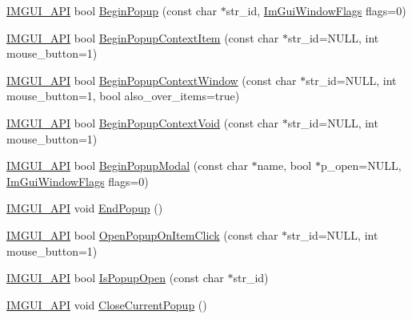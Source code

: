 \begin{DoxyCompactItemize}
\mbox{\hyperlink{imgui_8h_a43829975e84e45d1149597467a14bbf5}{I\+M\+G\+U\+I\+\_\+\+A\+PI}} bool \mbox{\hyperlink{namespace_im_gui_a10e213926d8ca212266bc5fbded1e026}{Begin\+Popup}} (const char $\ast$str\+\_\+id, \mbox{\hyperlink{imgui_8h_a0b8e067ab4f7a818828c8d89e531addc}{Im\+Gui\+Window\+Flags}} flags=0)
\item 
\mbox{\hyperlink{imgui_8h_a43829975e84e45d1149597467a14bbf5}{I\+M\+G\+U\+I\+\_\+\+A\+PI}} bool \mbox{\hyperlink{namespace_im_gui_a579fc507f5b5d164c8fd628aee3d7bbd}{Begin\+Popup\+Context\+Item}} (const char $\ast$str\+\_\+id=N\+U\+LL, int mouse\+\_\+button=1)
\item 
\mbox{\hyperlink{imgui_8h_a43829975e84e45d1149597467a14bbf5}{I\+M\+G\+U\+I\+\_\+\+A\+PI}} bool \mbox{\hyperlink{namespace_im_gui_acf98c99f041ea341d0328e071c56411b}{Begin\+Popup\+Context\+Window}} (const char $\ast$str\+\_\+id=N\+U\+LL, int mouse\+\_\+button=1, bool also\+\_\+over\+\_\+items=true)
\item 
\mbox{\hyperlink{imgui_8h_a43829975e84e45d1149597467a14bbf5}{I\+M\+G\+U\+I\+\_\+\+A\+PI}} bool \mbox{\hyperlink{namespace_im_gui_a87a2228929503fff067d2e167a690751}{Begin\+Popup\+Context\+Void}} (const char $\ast$str\+\_\+id=N\+U\+LL, int mouse\+\_\+button=1)
\item 
\mbox{\hyperlink{imgui_8h_a43829975e84e45d1149597467a14bbf5}{I\+M\+G\+U\+I\+\_\+\+A\+PI}} bool \mbox{\hyperlink{namespace_im_gui_a6d840f615c198c2342968f733fda11b3}{Begin\+Popup\+Modal}} (const char $\ast$name, bool $\ast$p\+\_\+open=N\+U\+LL, \mbox{\hyperlink{imgui_8h_a0b8e067ab4f7a818828c8d89e531addc}{Im\+Gui\+Window\+Flags}} flags=0)
\item 
\mbox{\hyperlink{imgui_8h_a43829975e84e45d1149597467a14bbf5}{I\+M\+G\+U\+I\+\_\+\+A\+PI}} void \mbox{\hyperlink{namespace_im_gui_aa6a9b5696f2ea7eed7683425fc77b8f2}{End\+Popup}} ()
\item 
\mbox{\hyperlink{imgui_8h_a43829975e84e45d1149597467a14bbf5}{I\+M\+G\+U\+I\+\_\+\+A\+PI}} bool \mbox{\hyperlink{namespace_im_gui_a546fc46d8f510cb17a2f272891e2f5b3}{Open\+Popup\+On\+Item\+Click}} (const char $\ast$str\+\_\+id=N\+U\+LL, int mouse\+\_\+button=1)
\item 
\mbox{\hyperlink{imgui_8h_a43829975e84e45d1149597467a14bbf5}{I\+M\+G\+U\+I\+\_\+\+A\+PI}} bool \mbox{\hyperlink{namespace_im_gui_a8f25c1565fca7cb9796c54e5cebc44ee}{Is\+Popup\+Open}} (const char $\ast$str\+\_\+id)
\item 
\mbox{\hyperlink{imgui_8h_a43829975e84e45d1149597467a14bbf5}{I\+M\+G\+U\+I\+\_\+\+A\+PI}} void \mbox{\hyperlink{namespace_im_gui_aeaec6479834db7918260fc082107f90b}{Close\+Current\+Popup}} ()

\end{DoxyCompactItemize}
